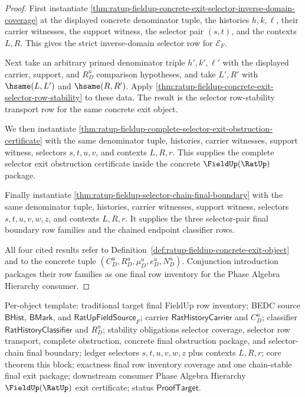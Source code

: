 \begin{proof}
First instantiate
\autoref{thm:ratup-fieldup-concrete-exit-selector-inverse-domain-coverage} at
the displayed concrete denominator tuple, the histories $h,k,\ell$, their
carrier witnesses, the support witness, the selector pair $(s,t)$, and the
contexts $L,R$. This gives the strict inverse-domain selector row for
$\mathcal E_F$.

Next take an arbitrary primed denominator triple $h',k',\ell'$ with the
displayed carrier, support, and $R_D^u$ comparison hypotheses, and take
$L',R'$ with $\hsame(L,L')$ and $\hsame(R,R')$. Apply
\autoref{thm:ratup-fieldup-concrete-exit-selector-row-stability} to these
data. The result is the selector row-stability transport row for the same
concrete exit object.

We then instantiate
\autoref{thm:ratup-fieldup-complete-selector-exit-obstruction-certificate} with
the same denominator tuple, histories, carrier witnesses, support witness,
selectors $s,t,u,v$, and contexts $L,R,r$. This supplies the complete selector
exit obstruction certificate inside the concrete $\FieldUp(\RatUp)$ package.

Finally instantiate \autoref{thm:ratup-fieldup-selector-chain-final-boundary}
with the same denominator tuple, histories, carrier witnesses, support witness,
selectors $s,t,u,v,w,z$, and contexts $L,R,r$. It supplies the three
selector-pair final boundary row families and the chained endpoint classifier
rows.

All four cited results refer to Definition~\ref{def:ratup-fieldup-concrete-exit-object}
and to the concrete tuple $(C_D^u,R_D^u,\mu_D^u,e_D^u,N_D^u)$. Conjunction
introduction packages their row families as one final row inventory for the
Phase Algebra Hierarchy consumer.
\end{proof}

Per-object template: traditional target final FieldUp row inventory; BEDC
source $\mathsf{BHist}$, $\mathsf{BMark}$, and
$\mathsf{RatUpFieldSource}_F$; carrier $\mathsf{RatHistoryCarrier}$ and
$C_D^u$; classifier $\mathsf{RatHistoryClassifier}$ and $R_D^u$; stability
obligations selector coverage, selector row transport, complete obstruction,
concrete final obstruction package, and selector-chain final boundary; ledger
selectors $s,t,u,v,w,z$ plus contexts $L,R,r$; core theorem this block;
exactness final row inventory coverage and one chain-stable final exit package;
downstream consumer Phase Algebra Hierarchy $\FieldUp(\RatUp)$ exit
certificate; status $\mathsf{ProofTarget}$.

